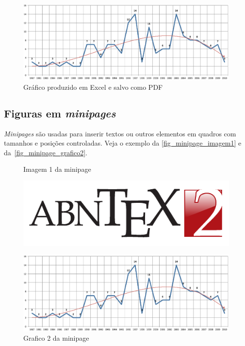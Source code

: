 \begin{figure}[htb]
\caption{%
  \label{fig_grafico}Gráfico produzido em Excel e salvo como PDF}
\begin{center}
  \includegraphics[scale=0.5]{graph.pdf}
\end{center}
\end{figure}

\subsection{Figuras em \emph{minipages}}

\emph{Minipages} são usadas para inserir textos ou outros elementos em quadros
com tamanhos e posições controladas. Veja o exemplo da
\autoref{fig_minipage_imagem1} e da~\autoref{fig_minipage_grafico2}.

\begin{figure}[htb]%
\label{teste}
\centering
  \begin{minipage}{0.4\textwidth}
    \centering
\caption{Imagem 1 da minipage}%
\label{fig_minipage_imagem1}
    \includegraphics[scale=0.9]{logo.pdf}
  \end{minipage}
  \hfill
  \begin{minipage}{0.4\textwidth}
    \centering
\caption{Grafico 2 da minipage}%
\label{fig_minipage_grafico2}
    \includegraphics[scale=0.2]{graph.pdf}
  \end{minipage}
\end{figure}

